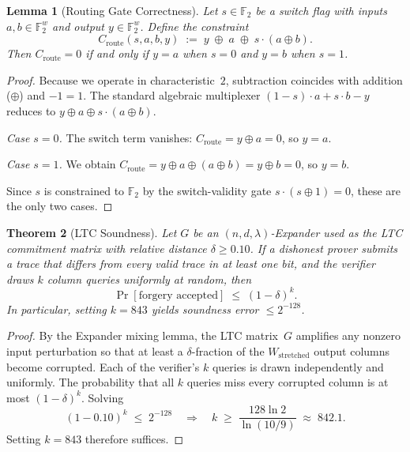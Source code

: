 \documentclass[11pt,a4paper]{article}
\newtheorem{theorem}{Theorem}[section]
\newtheorem{lemma}[theorem]{Lemma}
\begin{document}
\begin{lemma}[Routing Gate Correctness]\label{lem:routing}
Let $s \in \mathbb{F}_2$ be a switch flag with inputs
$a,b \in \mathbb{F}_2^w$ and output $y \in \mathbb{F}_2^w$.
Define the constraint
\begin{equation}\label{eq:routing}
  C_{\mathrm{route}}(s,a,b,y) \;:=\;
    y \;\oplus\; a \;\oplus\; s \cdot (a \oplus b).
\end{equation}
Then $C_{\mathrm{route}} = 0$ if and only if $y = a$ when $s = 0$
and $y = b$ when $s = 1$.
\end{lemma}

\begin{proof}
Because we operate in characteristic~$2$, subtraction coincides
with addition ($\oplus$) and $-1 = 1$.  The standard algebraic
multiplexer $(1-s)\cdot a + s\cdot b - y$ reduces to
$y \oplus a \oplus s \cdot (a \oplus b)$.

\emph{Case $s=0$.}  The switch term vanishes:
$C_{\mathrm{route}} = y \oplus a = 0$, so $y = a$.

\emph{Case $s=1$.}  We obtain
$C_{\mathrm{route}} = y \oplus a \oplus (a \oplus b)
  = y \oplus b = 0$,
so $y = b$.

Since $s$ is constrained to $\mathbb{F}_2$ by the switch-validity
gate $s \cdot (s \oplus 1) = 0$, these are the only two cases.
\end{proof}

\begin{theorem}[LTC Soundness]\label{thm:soundness}
Let $G$ be an $(n, d, \lambda)$-Expander used as the LTC commitment
matrix with relative distance $\delta \ge 0.10$.  If a dishonest
prover submits a trace that differs from every valid trace in at
least one bit, and the verifier draws $k$ column queries uniformly
at random, then
\[
  \Pr[\text{forgery accepted}] \;\le\; (1 - \delta)^{k}.
\]
In particular, setting $k = 843$ yields soundness error
$\le 2^{-128}$.
\end{theorem}

\begin{proof}
By the Expander mixing lemma, the LTC matrix~$G$ amplifies any
nonzero input perturbation so that at least a $\delta$-fraction of
the $W_{\mathrm{stretched}}$ output columns become corrupted.  Each
of the verifier's $k$ queries is drawn independently and uniformly.
The probability that all $k$ queries miss every corrupted column is
at most $(1 - \delta)^k$.  Solving
\[
  (1 - 0.10)^k \;\le\; 2^{-128}
  \quad\Longrightarrow\quad
  k \;\ge\; \frac{128 \ln 2}{\ln(10/9)}
    \;\approx\; 842.1.
\]
Setting $k = 843$ therefore suffices.
\end{proof}
\end{document}
